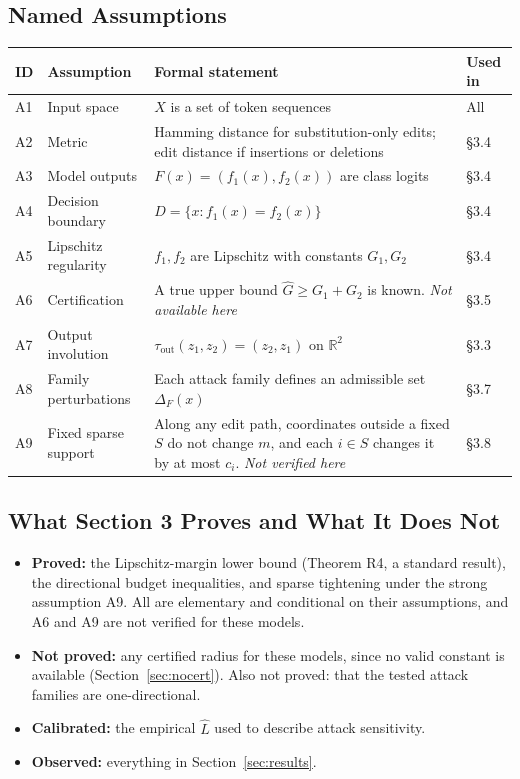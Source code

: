 \documentclass[11pt]{article}
\newcommand{\Lhat}{\hat{L}}
\begin{document}
\subsection{Named Assumptions}\label{sec:assumptions}
\begin{center}
\small
\begin{tabular}{@{}llp{6.4cm}l@{}}
\toprule
ID & Assumption & Formal statement & Used in \\
\midrule
A1 & Input space & $X$ is a set of token sequences & All \\
A2 & Metric & Hamming distance for substitution-only edits; edit distance if insertions or deletions & \S3.4 \\
A3 & Model outputs & $F(x) = (f_1(x), f_2(x))$ are class logits & \S3.4 \\
A4 & Decision boundary & $D = \{x : f_1(x) = f_2(x)\}$ & \S3.4 \\
A5 & Lipschitz regularity & $f_1, f_2$ are Lipschitz with constants $G_1, G_2$ & \S3.4 \\
A6 & Certification & A true upper bound $\hat{G} \ge G_1 + G_2$ is known. \emph{Not available here} & \S3.5 \\
A7 & Output involution & $\tau_{\mathrm{out}}(z_1, z_2) = (z_2, z_1)$ on $\mathbb{R}^2$ & \S3.3 \\
A8 & Family perturbations & Each attack family defines an admissible set $\Delta_F(x)$ & \S3.7 \\
A9 & Fixed sparse support & Along any edit path, coordinates outside a fixed $S$ do not change $m$, and each $i \in S$ changes it by at most $c_i$. \emph{Not verified here} & \S3.8 \\
\bottomrule
\end{tabular}
\end{center}

\subsection{What Section 3 Proves and What It Does Not}
\begin{itemize}
  \item \textbf{Proved:} the Lipschitz-margin lower bound (Theorem R4, a standard result), the directional budget inequalities, and sparse tightening under the strong assumption A9. All are elementary and conditional on their assumptions, and A6 and A9 are not verified for these models.
  \item \textbf{Not proved:} any certified radius for these models, since no valid constant is available (Section~\ref{sec:nocert}). Also not proved: that the tested attack families are one-directional.
  \item \textbf{Calibrated:} the empirical $\Lhat$ used to describe attack sensitivity.
  \item \textbf{Observed:} everything in Section~\ref{sec:results}.
\end{itemize}
\end{document}
